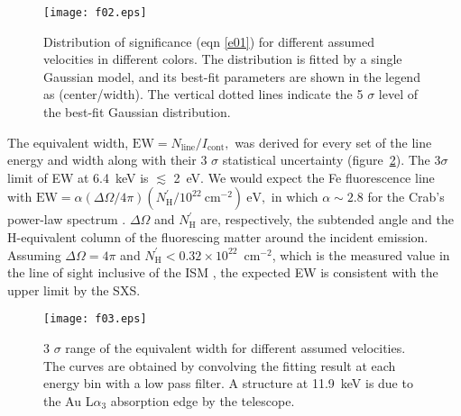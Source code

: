 \documentclass[]{pasj01}
\begin{document}
\begin{figure}
 \begin{center}
  \texttt{[image: f02.eps]}
 \end{center}
 \caption{Distribution of significance (eqn \ref{e01}) for different assumed velocities
 in different colors. The distribution is fitted by a single Gaussian model, and its
 best-fit parameters are shown in the legend as (center/width). The vertical dotted
 lines indicate the 5 $\sigma$ level of the best-fit Gaussian distribution.}
\label{f02}
\end{figure}

The equivalent width,
\begin{math}
\mathrm{EW} = N_{\mathrm{line}} / I_{\mathrm{cont}},
\end{math}
was derived for every set of the line energy and width along with their 3 $\sigma$
statistical uncertainty (figure~\ref{f03}). The 3$\sigma$ limit of EW at 6.4~keV is
$\lesssim$ 2~eV. We would expect the Fe fluorescence line with
\begin{math}
 \mathrm{EW} = \alpha (\Delta \Omega/4\pi) (N_{\mathrm{H}}^{\prime} / \mathrm{10^{22}~cm^{-2}})~\mathrm{eV},
\end{math}
in which $\alpha \sim 2.8$ for the Crab's power-law spectrum \citep{krolik87}. $\Delta
\Omega$ and $N_{\mathrm{H}}^{\prime}$ are, respectively, the subtended angle and the
H-equivalent column of the fluorescing matter around the incident emission. Assuming 
$\Delta \Omega = 4 \pi$ and $N_{\mathrm{H}}^{\prime} < 0.32 \times 10^{22}$~cm$^{-2}$,
which is the measured value in the line of sight inclusive of the ISM \citep{mori04},
the expected EW is consistent with the upper limit by the SXS.


\begin{figure}
 \begin{center}
  \texttt{[image: f03.eps]}
 \end{center}
 \caption{3 $\sigma$ range of the equivalent width for different assumed
 velocities. The curves are obtained by convolving the fitting result at each energy bin
 with a low pass filter. A structure at 11.9~keV is due to the Au L$\alpha_{3}$
 absorption edge by the telescope.}
\label{f03}
\end{figure}
\end{document}
